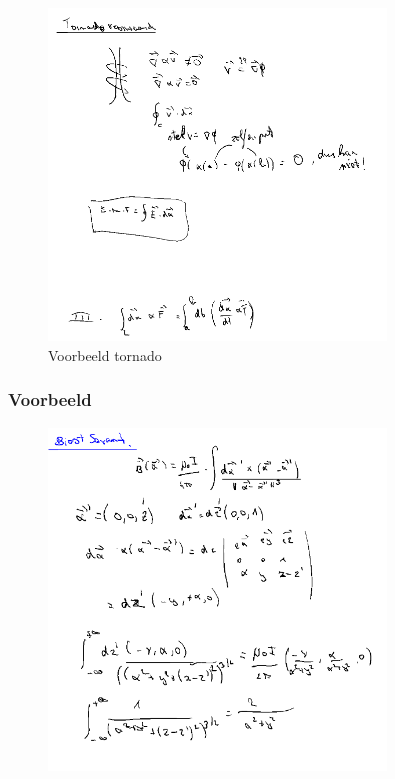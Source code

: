 \documentclass[a4paper]{report}
\begin{document}
\begin{figure}[H]
	\centering
	\includegraphics[width=0.8\textwidth]{assets/voorbeeld_tornado.png}
	\caption{Voorbeeld tornado}
	\label{fig:voorbeeld_tornado}
\end{figure}

\subsubsection{Voorbeeld}

\begin{figure}[H]
	\centering
	\includegraphics[width=0.8\textwidth]{assets/biost_savant.png}
	\caption{}
	\label{fig:biost_savant}
\end{figure}
\end{document}
